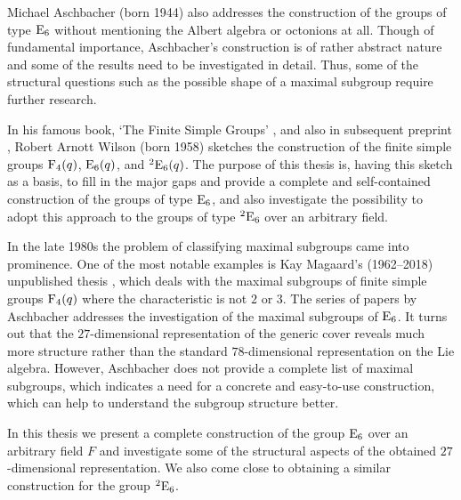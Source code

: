 Michael Aschbacher (born 1944) also addresses the 
construction of the 
groups of type $\mathrm{E}_6$ without mentioning the Albert
algebra or octonions at all. Though of fundamental importance,
Aschbacher's construction is of rather abstract nature and some
of the results need to be investigated in detail. 
Thus, some of the structural questions such as
the possible shape of a maximal subgroup require further research. 

In his famous book, `The Finite Simple Groups' \cite{WilsonBook},
and also in subsequent preprint \cite{WilsonPaper},
Robert Arnott Wilson (born 1958) sketches the
construction of the finite simple groups $\mathrm{F}_4(q)$, 
$\mathrm{E}_6(q)$, and ${}^2\mathrm{E}_6(q)$. The purpose of this thesis is,
having this sketch as a basis, to fill in the major gaps and 
provide a complete and self-contained construction of the groups 
of type $\mathrm{E}_6$, and also investigate the possibility to adopt this
approach to the groups of type ${}^2\mathrm{E}_6$ over an arbitrary field.

In the late 1980s the problem of classifying maximal subgroups 
came into prominence. One of the most notable examples is
Kay Magaard's (1962--2018) unpublished thesis \cite{Magaard}, which deals
with the maximal subgroups of finite simple groups $\mathrm{F}_4(q)$
where the characteristic is not $2$ or $3$. The series of papers by 
Aschbacher \cite{Asch1,Asch2,Asch3,Asch4} addresses the investigation
of the maximal subgroups of $\mathrm{E}_6$. It turns out that the $27$-dimensional
representation of the generic cover reveals much more structure rather 
than the standard $78$-dimensional representation on the Lie algebra.
However, Aschbacher does not provide a complete list of maximal subgroups, 
which indicates a need for a concrete and easy-to-use construction, which can
help to understand the subgroup structure better. 

In this thesis we present a complete construction
of the group $\mathord{\mathrm{E}}_6$ over an arbitrary field 
$F$ and investigate some of the structural aspects
of the obtained $27$-dimensional representation. 
We also come close to obtaining a similar 
construction for the group ${}^2\mathord{\mathrm{E}}_6$.



